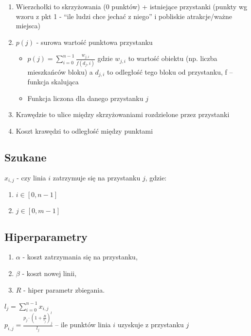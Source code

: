 \documentclass[12pt,a4paper,openright]{mwrep}
\begin{document}
	\begin{enumerate}
		\item Wierzchołki to skrzyżowania (0 punktów) + istniejące przystanki (punkty wg wzoru z pkt 1 - “ile ludzi chce jechać z niego” i pobliskie atrakcje/ważne miejsca)
		\item $p(j)$ - surowa wartość punktowa przystanku
		\begin{itemize}
			\item $p(j) = \sum_{i=0}^{n-1} \frac{w_{j, i}}{f(d_j, i)}$ gdzie $w_{j, i}$ to wartość obiektu (np. liczba mieszkańców bloku) a $d_{j,i}$ to odległość tego bloku od przystanku, f – funkcja skalująca
			\item Funkcja liczona dla danego przystanku $j$
		\end{itemize}
		\item Krawędzie to ulice między skrzyżowaniami rozdzielone przez przystanki
		\item Koszt krawędzi to odległość między punktami
	\end{enumerate}










\subsection{Szukane}
	$x_{i,j}$ - czy linia $i$ zatrzymuje się na przystanku $j$, gdzie:
	\begin{enumerate}
		\item $i \in \left[ 0, n-1 \right]$
		\item $j \in \left[ 0, m-1 \right]$
	\end{enumerate}

\subsection{Hiperparametry}
	\begin{enumerate}
		\item $\alpha$ - koszt zatrzymania się na przystanku,
		\item $\beta$ - koszt nowej linii,
		\item $R$ - hiper parametr zbiegania.
	\end{enumerate}



$l_j = \sum_{i=0}^{n-1} x_{i, j}$\\
$p_{i, j} = \frac{p_j \cdot (1+\frac{R}{l_j})^l_j}{l_j}$ -- ile punktów linia $i$ uzyskuje z przystanku $j$
\end{document}
